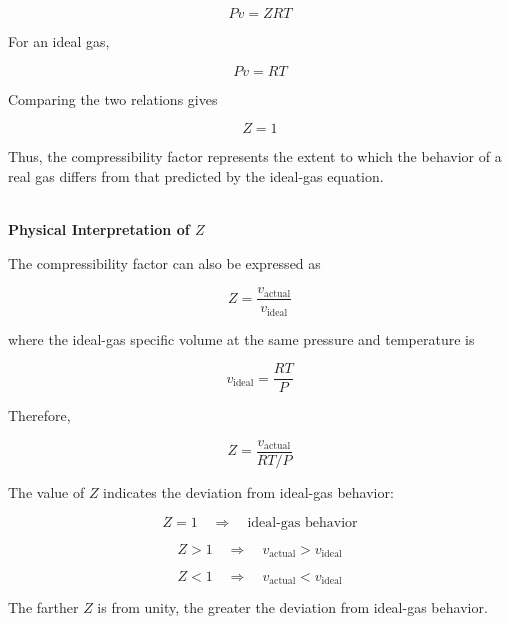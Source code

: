 \documentclass[12pt]{article}
\begin{document}
\begin{equation*}
\boxed{Pv=ZRT}
\end{equation*}

For an ideal gas,

\begin{equation*}
Pv=RT
\end{equation*}

Comparing the two relations gives

\begin{equation*}
\boxed{Z=1}
\end{equation*}

Thus, the compressibility factor represents the extent to which the behavior of a real gas differs from that predicted by the ideal-gas equation.

\textbf{\\ Physical Interpretation of $Z$}

The compressibility factor can also be expressed as

\begin{equation*}
\boxed{
Z=\frac{v_{\mathrm{actual}}}{v_{\mathrm{ideal}}}
}
\end{equation*}

where the ideal-gas specific volume at the same pressure and temperature is

\begin{equation*}
\boxed{
v_{\mathrm{ideal}}=\frac{RT}{P}
}
\end{equation*}

Therefore,

\begin{equation*}
Z=
\frac{v_{\mathrm{actual}}}
{RT/P}
\end{equation*}

The value of $Z$ indicates the deviation from ideal-gas behavior:

\begin{equation*}
\boxed{Z=1\quad\Rightarrow\quad\text{ideal-gas behavior}}
\end{equation*}

\begin{equation*}
\boxed{Z>1\quad\Rightarrow\quad
v_{\mathrm{actual}}>v_{\mathrm{ideal}}}
\end{equation*}

\begin{equation*}
\boxed{Z<1\quad\Rightarrow\quad
v_{\mathrm{actual}}<v_{\mathrm{ideal}}}
\end{equation*}

The farther $Z$ is from unity, the greater the deviation from ideal-gas behavior.
\end{document}

